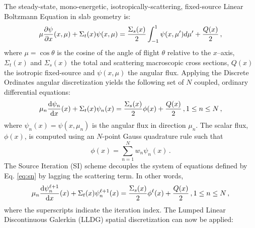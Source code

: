
\newcommand{\rell}{^\ell}
\newcommand{\elll}{^{\ell+1}}

The steady-state, mono-energetic, isotropically-scattering, fixed-source Linear Boltzmann Equation in slab geometry is: 
	\begin{equation} \label{eq:bte}
		\mu \frac{\partial \psi}{\partial x}(x, \mu) + \Sigma_t(x) \psi(x,\mu) = 
		\frac{\Sigma_s(x)}{2} \int_{-1}^{1} \psi(x, \mu') d\mu' + \frac{Q(x)}{2} \,,
	\end{equation}
where $\mu = \cos\theta$ is the cosine of the angle of flight $\theta$ relative to the $x$--axis, $\Sigma_t(x)$ and $\Sigma_s(x)$ the total and scattering macroscopic cross sections, $Q(x)$ the isotropic fixed-source and $\psi(x, \mu)$ the angular flux. Applying the Discrete Ordinates angular discretization yields the following set of $N$ coupled, ordinary differential equations: 
	\begin{equation} \label{eq:sn}
		\mu_n \frac{\mathop{}\!\mathrm{d} \psi_n}{\mathop{}\!\mathrm{d} x}(x) + \Sigma_t(x) \psi_n(x) = 
		\frac{\Sigma_s(x)}{2} \phi(x) + \frac{Q(x)}{2} \,, 1 \leq n \leq N \,,
	\end{equation}
where $\psi_n(x) = \psi(x, \mu_n)$ is the angular flux in direction $\mu_n$. The scalar flux, $\phi(x)$, is computed using an $N$-point Gauss quadrature rule such that 
	\begin{equation} \label{eq:phiquad}
		\phi(x) = \sum_{n=1}^N w_n \psi_n(x) \,.
	\end{equation}
The Source Iteration (SI) scheme decouples the system of equations defined by Eq. \ref{eq:sn} by lagging the scattering term. In other words, 
	\begin{equation} \label{eq:si}
		\mu_n \dderiv{\psi_n\elll}{x}(x) + \Sigma_t(x) \psi_n\elll(x) = 
		\frac{\Sigma_s(x)}{2} \phi^\ell(x) + \frac{Q(x)}{2} \,, 1 \leq n \leq N \,,
	\end{equation}
where the superscripts indicate the iteration index. The Lumped Linear Discontinuous Galerkin (LLDG) spatial discretization can now be applied: 
